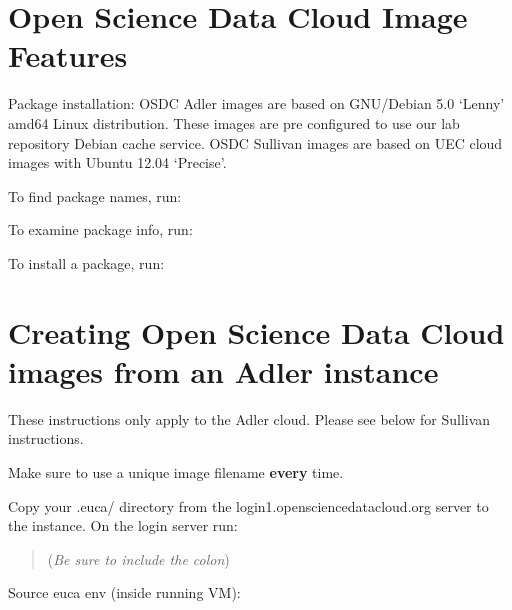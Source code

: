 \documentclass[letterpaper,10pt,english]{sphinxmanual}
\begin{document}
\section{Open Science Data Cloud Image Features}
\label{basicusage:open-science-data-cloud-image-features}
Package installation:
OSDC Adler images are based on GNU/Debian 5.0 ‘Lenny’ amd64 Linux distribution. These images are pre configured to use our lab repository Debian cache service.
OSDC Sullivan images are based on UEC cloud images with Ubuntu 12.04 ‘Precise’.

To find package names, run:
\begin{quote}

\end{quote}

To examine package info, run:
\begin{quote}

\end{quote}

To install a package, run:
\begin{quote}

\end{quote}


\section{Creating Open Science Data Cloud images from an Adler instance}
\label{basicusage:creating-open-science-data-cloud-images-from-an-adler-instance}
These instructions only apply to the Adler cloud. Please see below for Sullivan instructions.
\begin{quote}

\end{quote}

Make sure to use a unique image filename \textbf{every} time.

Copy your .euca/ directory from the login1.opensciencedatacloud.org server to the instance. On the login server run:
\begin{quote}

 (\emph{Be sure to include the colon})
\end{quote}

Source euca env (inside running VM):
\begin{quote}

\end{quote}
\end{document}
